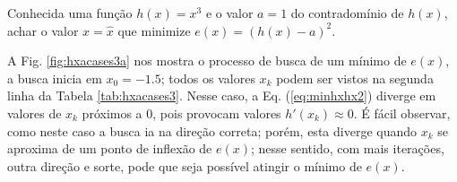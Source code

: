 \begin{example}\label{ex:minhxhx3}
Conhecida uma função $h(x)=x^3$ e o valor $a=1$ do contradomínio de $h(x)$,
achar o valor $x=\hat{x}$ que minimize $e(x)=(h(x)-a)^2$.
\end{example}
\begin{SolutionT}\label{sol:minhxhx3}
 A Fig. \ref{fig:hxacases3a} nos mostra o processo de busca de um mínimo
 de $e(x)$, a busca inicia em $x_0=-1.5$;
 todos os valores $x_{k}$ podem ser vistos na segunda linha da
Tabela \ref{tab:hxacases3}. Nesse caso, a Eq. (\ref{eq:minhxhx2}) diverge em 
valores de $x_{k}$ próximos a $0$, pois provocam valores  $h'(x_{k})\approx 0$.
É fácil observar, como neste caso a busca ia na direção correta;
porém, esta diverge quando $x_{k}$ se aproxima de um ponto de inflexão de $e(x)$;
nesse sentido, com mais iterações, outra direção e sorte, 
pode que seja possível atingir o mínimo de $e(x)$.
\end{SolutionT}

